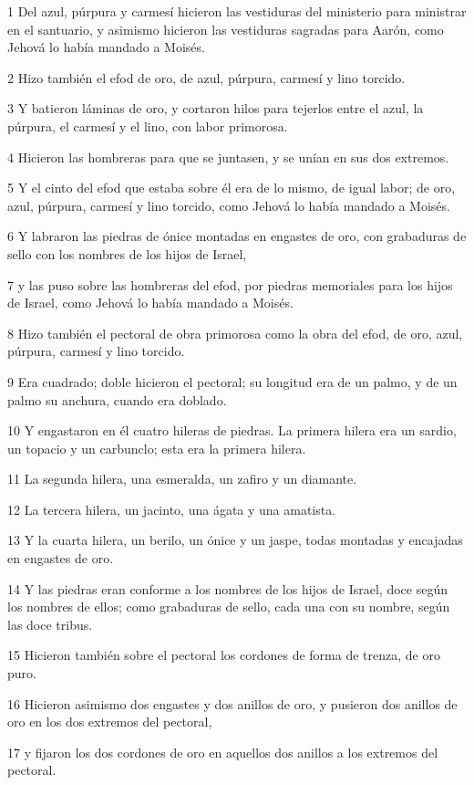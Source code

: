 \par 1 Del azul, púrpura y carmesí hicieron las vestiduras del ministerio para ministrar en el santuario, y asimismo hicieron las vestiduras sagradas para Aarón, como Jehová lo había mandado a Moisés.
\par 2 Hizo también el efod de oro, de azul, púrpura, carmesí y lino torcido.
\par 3 Y batieron láminas de oro, y cortaron hilos para tejerlos entre el azul, la púrpura, el carmesí y el lino, con labor primorosa.
\par 4 Hicieron las hombreras para que se juntasen, y se unían en sus dos extremos.
\par 5 Y el cinto del efod que estaba sobre él era de lo mismo, de igual labor; de oro, azul, púrpura, carmesí y lino torcido, como Jehová lo había mandado a Moisés.
\par 6 Y labraron las piedras de ónice montadas en engastes de oro, con grabaduras de sello con los nombres de los hijos de Israel,
\par 7 y las puso sobre las hombreras del efod, por piedras memoriales para los hijos de Israel, como Jehová lo había mandado a Moisés.
\par 8 Hizo también el pectoral de obra primorosa como la obra del efod, de oro, azul, púrpura, carmesí y lino torcido.
\par 9 Era cuadrado; doble hicieron el pectoral; su longitud era de un palmo,  y de un palmo su anchura, cuando era doblado.
\par 10 Y engastaron en él cuatro hileras de piedras. La primera hilera era un sardio, un topacio y un carbunclo; esta era la primera hilera.
\par 11 La segunda hilera, una esmeralda, un zafiro y un diamante.
\par 12 La tercera hilera, un jacinto, una ágata y una amatista.
\par 13 Y la cuarta hilera, un berilo, un ónice y un jaspe, todas montadas y encajadas en engastes de oro.
\par 14 Y las piedras eran conforme a los nombres de los hijos de Israel, doce según los nombres de ellos; como grabaduras de sello, cada una con su nombre, según las doce tribus.
\par 15 Hicieron también sobre el pectoral los cordones de forma de trenza, de oro puro.
\par 16 Hicieron asimismo dos engastes y dos anillos de oro, y pusieron dos anillos de oro en los dos extremos del pectoral,
\par 17 y fijaron los dos cordones de oro en aquellos dos anillos a los extremos del pectoral.
